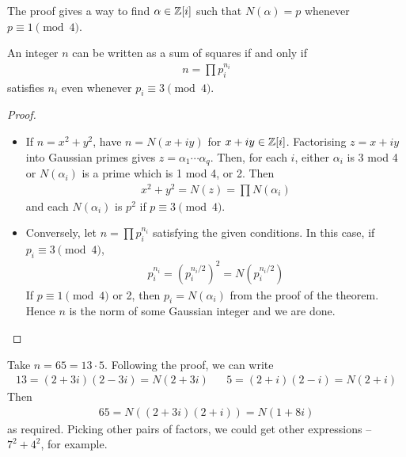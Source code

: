 \documentclass{../../template/note}
\begin{document}
    \begin{remark*}
        The proof gives a way to find $\alpha \in \mathbb Z[i]$ such that $N(\alpha) = p$ whenever $p \equiv 1 \pmod 4$.
    \end{remark*}
    
    \begin{corollary}
        An integer $n$ can be written as a sum of squares if and only if
        \begin{align*}
            n = \prod p_i^{n_i}
        \end{align*}
        satisfies $n_i$ even whenever $p_i \equiv 3 \pmod 4$.        
    \end{corollary}
    
    \begin{proof}\
        \begin{itemize}
            \item[$\implies$] If $n=x^2+y^2$, have $n=N(x+iy)$ for $x+iy \in \mathbb Z[i]$. Factorising $z = x+iy$ into Gaussian primes gives $z = \alpha_1 \cdots \alpha_q$. Then, for each $i$, either $\alpha_i$ is 3 mod 4 or $N(\alpha_i)$ is a prime which is 1 mod 4, or 2. Then
            \begin{align*}
                x^2+y^2 = N(z) = \prod N(\alpha_i)
            \end{align*}
            and each $N(\alpha_i)$ is $p^2$ if $p \equiv 3 \pmod 4$.
            \item[$\impliedby$] Conversely, let $n = \prod p_i^{n_i}$ satisfying the given conditions. In this case, if $p_i \equiv 3 \pmod 4$,
            \begin{align*}
                p_i^{n_i} = \left(p_i^{n_i/2}\right)^2 = N(p_i^{n_i/2})
            \end{align*}
            If $p \equiv 1 \pmod 4$ or 2, then $p_i = N(\alpha_i)$ from the proof of the theorem. Hence $n$ is the norm of some Gaussian integer and we are done.                        
        \end{itemize}
    \end{proof}
    
    \begin{example*}
        Take $n = 65 = 13\cdot 5$. Following the proof, we can write
        \begin{align*}
            13 = (2+3i)(2-3i) = N(2+3i) && 5 = (2+i)(2-i) = N(2+i)
        \end{align*}
        Then
        \begin{align*}
            65 = N\left((2+3i)(2+i)\right) = N(1+8i)
        \end{align*}
        as required. Picking other pairs of factors, we could get other expressions -- $7^2+4^2$, for example.       
    \end{example*}
    
\end{document}
